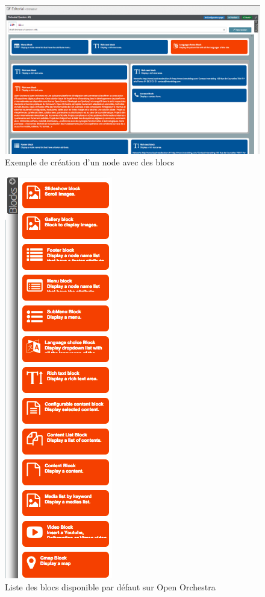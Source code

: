      \begin{figure}[H]
          \includegraphics[scale=0.4]{images/annexe_node}
 
        \caption{Exemple de création d'un node avec des blocs}
        \label{annexe_node}
      \end{figure}
     \begin{figure}[H]
        \begin{center}
          \includegraphics[scale=0.6]{images/annexe_bloc}
        \end{center}
        \caption{Liste des blocs disponible par défaut sur Open Orchestra}
        \label{annexe_bloc}
      \end{figure}